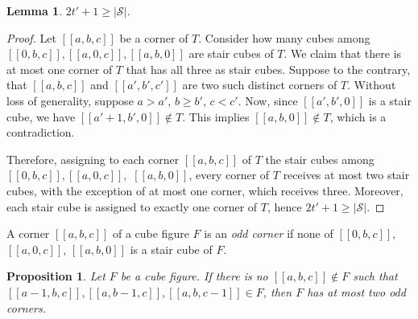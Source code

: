 \documentclass[12pt]{article}
\newtheorem{lemma}[thm]{Lemma}
\newtheorem{prop}[thm]{Proposition}
\theoremstyle{remark}
\begin{document}
\begin{lemma}\label{lemma_type_suppthm_upperbound}
    $  2t'+1 \geq |\mathcal{S}|$.
\end{lemma}

\begin{proof}
    Let $[[a,b,c]]$ be a corner of $T$. Consider how many cubes among $[[0,b,c]],[[a,0,c]],[[a,b,0]]$ are stair cubes of $T$. We claim that there is at most one corner of $T$ that has all three as stair cubes. Suppose to the contrary, that $[[a,b,c]]$ and $[[a',b',c']]$ are two such distinct corners of $T$. Without loss of generality, suppose $a > a'$, $b \geq b'$, $c < c'$. Now, since $[[a',b',0]]$ is a stair cube, we have $[[a'+1,b',0]] \notin T$. This implies $[[a,b,0]] \notin T$, which is a contradiction. 
    
    Therefore, assigning to each corner $[[a,b,c]]$ of $T$ the stair cubes among $[[0,b,c]],[[a,0,c]],$ $[[a,b,0]]$, every corner of $T$ receives at most two stair cubes, with the exception of at most one corner, which receives three. Moreover, each stair cube is assigned to exactly one corner of $T$, hence $ 2t'+1 \geq |\mathcal{S}|$.
\end{proof}



A corner $[[a,b,c]]$ of a cube figure $F$ is an \emph{odd corner}
if none of $[[0,b,c]]$, $[[a,0,c]]$, $[[a,b,0]]$ is a stair cube of $F$.


\begin{prop}\label{prop_type_suppthm_odd_corners}
    Let $F$ be a cube figure. If there is no $[[a,b,c]] \notin F$ such that $[[a-1,b,c]],[[a,b-1,c]],[[a,b,c-1]] \in F$, then $F$ has at most two odd corners.
\end{prop}
\end{document}
